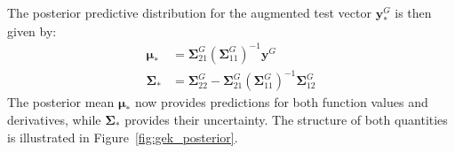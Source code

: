 \documentclass[12pt]{article}
\begin{document}
The posterior predictive distribution for the augmented test vector $\mathbf{y}^{G}_*$ is then given by:
\begin{equation}
	\label{eqn:full_gek_posterior}
	\begin{split}
		\boldsymbol{\mu}_{*} &= \boldsymbol{\Sigma}^{G}_{21} \left(\boldsymbol{\Sigma}^{G}_{11}\right)^{-1} \mathbf{y}^{G} \\
		\boldsymbol{\Sigma}_{*} &=  \boldsymbol{\Sigma}^{G}_{22} - \boldsymbol{\Sigma}^{G}_{21} \left(\boldsymbol{\Sigma}^{G}_{11}\right)^{-1} \boldsymbol{\Sigma}^{G}_{12}
	\end{split}
\end{equation}
The posterior mean $\boldsymbol{\mu}_{*}$ now provides predictions for both function values and derivatives, while $\boldsymbol{\Sigma}_{*}$ provides their uncertainty. The structure of both quantities is illustrated in Figure~\ref{fig:gek_posterior}.
\end{document}
